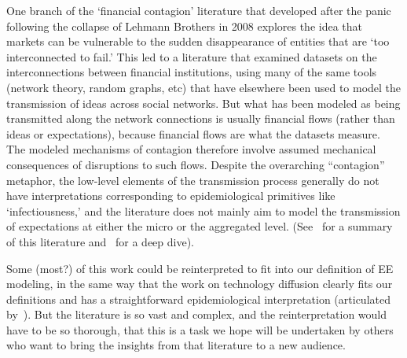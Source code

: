 
One branch of the `financial contagion' literature that developed after the panic following the collapse of Lehmann Brothers in 2008 explores the idea that markets can be vulnerable to the sudden disappearance of entities that are `too interconnected to fail.' This led to a literature that examined datasets on the interconnections between financial institutions, using many of the same tools (network theory, random graphs, etc) that have elsewhere been used to model the transmission of ideas across social networks.  But what has been modeled as being transmitted along the network connections is usually financial flows (rather than ideas or expectations), because financial flows are what the datasets measure.  The modeled mechanisms of contagion therefore involve assumed mechanical consequences of disruptions to such flows.  Despite the overarching ``contagion'' metaphor, the low-level elements of the transmission process generally do not have interpretations corresponding to epidemiological primitives like `infectiousness,' and the literature does not mainly aim to model the transmission of expectations at either the micro or the aggregated level.  (See~\cite{glasserman2016contagion} for a summary of this literature and~\cite{cabrales2015financial} for a deep dive).

Some (most?) of this work could be reinterpreted to fit into our definition of EE modeling, in the same way that the work on technology diffusion clearly fits our definitions and has a straightforward epidemiological interpretation (articulated by~\cite{arrow_classificatory_1969}).  But the literature is so vast and complex, and the reinterpretation would have to be so thorough, that this is a task we hope will be undertaken by others who want to bring the insights from that literature to a new audience.

